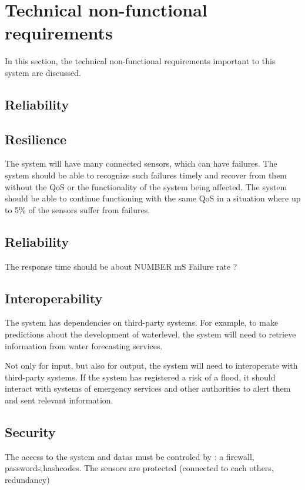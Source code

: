 \section{Technical non-functional requirements}
In this section, the technical non-functional requirements important to this system are discussed.

\subsection{Reliability}

\subsection{Resilience}
The system will have many connected sensors, which can have failures. 
The system should be able to recognize such failures timely and recover from them without the QoS or the functionality of the system being affected. 
The system should be able to continue functioning with the same QoS in a situation where up to 5\% of the sensors suffer from failures.  %

\subsection{Reliability}
The response time should be about NUMBER mS
Failure rate ?

\subsection{Interoperability}
The system has dependencies on third-party systems. For example, to make predictions about the development of waterlevel, the system will need to retrieve information from water forecasting services. 

Not only for input, but also for output, the system will need to interoperate with third-party systems. If the system has registered a risk of a flood, it should interact with systems of emergency services and other authorities to alert them and sent relevant information.

\subsection{Security}
The access to the system and datas must be controled by : a firewall, passwords,hashcodes.
The sensors are protected (connected to each others, redundancy)


